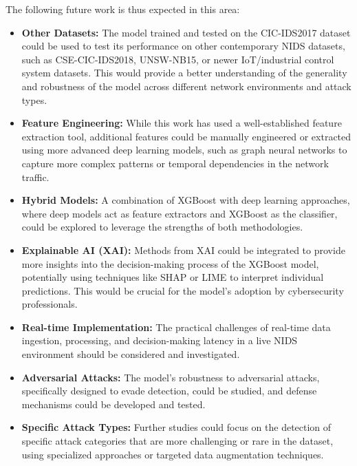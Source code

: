 The following future work is thus expected in this area:

\begin{itemize} 
\item \textbf{Other Datasets: } The model trained and tested on the CIC-IDS2017 dataset could be used to test its performance on other contemporary NIDS datasets, such as CSE-CIC-IDS2018, UNSW-NB15, or newer IoT/industrial control system datasets. This would provide a better understanding of the generality and robustness of the model across different network environments and attack types.
\item \textbf{Feature Engineering: } While this work has used a well-established feature extraction tool, additional features could be manually engineered or extracted using more advanced deep learning models, such as graph neural networks to capture more complex patterns or temporal dependencies in the network traffic.
\item \textbf{Hybrid Models: } A combination of XGBoost with deep learning approaches, where deep models act as feature extractors and XGBoost as the classifier, could be explored to leverage the strengths of both methodologies.
\item \textbf{Explainable AI (XAI): } Methods from XAI could be integrated to provide more insights into the decision-making process of the XGBoost model, potentially using techniques like SHAP or LIME to interpret individual predictions. This would be crucial for the model's adoption by cybersecurity professionals.
\item \textbf{Real-time Implementation: } The practical challenges of real-time data ingestion, processing, and decision-making latency in a live NIDS environment should be considered and investigated.
\item \textbf{Adversarial Attacks: } The model's robustness to adversarial attacks, specifically designed to evade detection, could be studied, and defense mechanisms could be developed and tested.
\item \textbf{Specific Attack Types: } Further studies could focus on the detection of specific attack categories that are more challenging or rare in the dataset, using specialized approaches or targeted data augmentation techniques.
\end{itemize} 